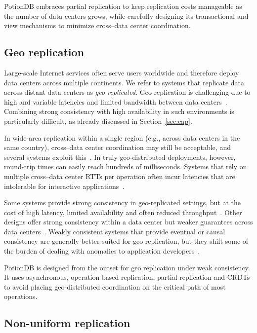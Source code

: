 PotionDB embraces partial replication to keep replication costs manageable
as the number of data centers grows, while carefully designing its transactional
and view mechanisms to minimize cross–data center coordination.

\subsection{Geo replication}

Large-scale Internet services often serve users worldwide and therefore deploy
data centers across multiple continents. We refer to systems that replicate data
across distant data centers as \emph{geo-replicated}. Geo replication is
challenging due to high and variable latencies and limited bandwidth between
data centers~\cite{spanner,bailis2013eventually}. Combining strong
consistency with high availability in such environments is particularly
difficult, as already discussed in Section~\ref{sec:cap}.

In wide-area replication within a single region (e.g., across data centers in
the same country), cross–data center coordination may still be acceptable, and
several systems exploit this~\cite{spanner,occic2012causal}. In truly
geo-distributed deployments, however, round-trip times can easily reach hundreds
of milliseconds. Systems that rely on multiple cross–data center RTTs per
operation often incur latencies that are intolerable for interactive
applications~\cite{bailis2013eventually,spanner}.

Some systems provide strong consistency in geo-replicated settings, but at the
cost of high latency, limited availability and often reduced
throughput~\cite{spanner,mdcc,slog,detock}. Other designs offer strong
consistency within a data center but weaker guarantees across data
centers~\cite{occic2012causal,cops,eiger}. Weakly consistent systems that provide
eventual or causal consistency are generally better suited for geo replication,
but they shift some of the burden of dealing with anomalies to application
developers~\cite{dynamo,occic2012causal,bailis2013eventually}.

PotionDB is designed from the outset for geo replication under weak consistency.
It uses asynchronous, operation-based replication, partial replication and
CRDTs to avoid placing geo-distributed coordination on the critical path of most
operations.

\subsection{Non-uniform replication}
\label{subsec:nonuniform}

